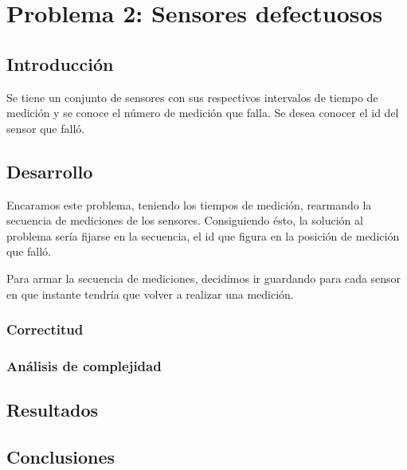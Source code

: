 \section{Problema 2: Sensores defectuosos}

\subsection{Introducci\'on}

\quad Se tiene un conjunto de sensores con sus respectivos intervalos de tiempo de medici\'on y se conoce el n\'umero de medici\'on que falla. Se desea conocer el id del sensor que fall\'o. 

\subsection{Desarrollo}

\quad Encaramos este problema, teniendo los tiempos de medici\'on, rearmando la secuencia de mediciones de los sensores. Consiguiendo \'esto, la soluci\'on al problema ser\'ia fijarse en la secuencia, el id que figura en la posici\'on de medici\'on que fall\'o.


\quad Para armar la secuencia de mediciones, decidimos ir guardando para cada sensor en que instante tendr\'ia que volver a realizar una medici\'on.


\subsubsection{Correctitud}

\subsubsection{An\'alisis de complejidad}

\subsection{Resultados}

\subsection{Conclusiones}